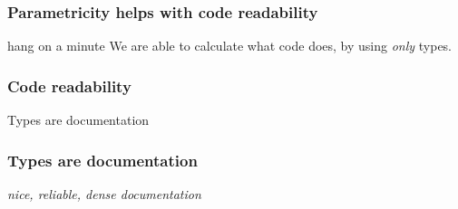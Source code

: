 \begin{frame}
\frametitle{Parametricity helps with code readability}
\begin{block}{hang on a minute}
We are able to calculate what code does, by using \emph{only} types.
\end{block}
\end{frame}

\begin{frame}
\frametitle{Code readability}
\begin{center}
Types are documentation
\end{center}
\end{frame}

\begin{frame}
\frametitle{Types are documentation}
\begin{center}
\emph{nice, reliable, dense documentation}
\end{center}
\end{frame}
